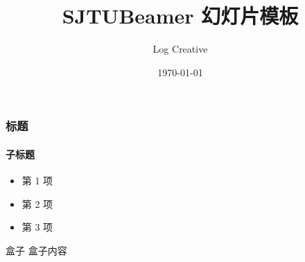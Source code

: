 \documentclass{beamer}
\begin{document}
\begin{CJK}{UTF8}{song}
    \title{\textsf{SJTUBeamer} 幻灯片模板}
    \author{Log Creative}
    \date{\today}

    \maketitle

    \begin{frame}
        \frametitle{标题}
        \framesubtitle{子标题}

        \begin{itemize}
            \item 第 1 项
            \item 第 2 项
            \item 第 3 项
        \end{itemize}

        \begin{block}{盒子}
            盒子内容
        \end{block}
    \end{frame}
\end{CJK}
\end{document}
